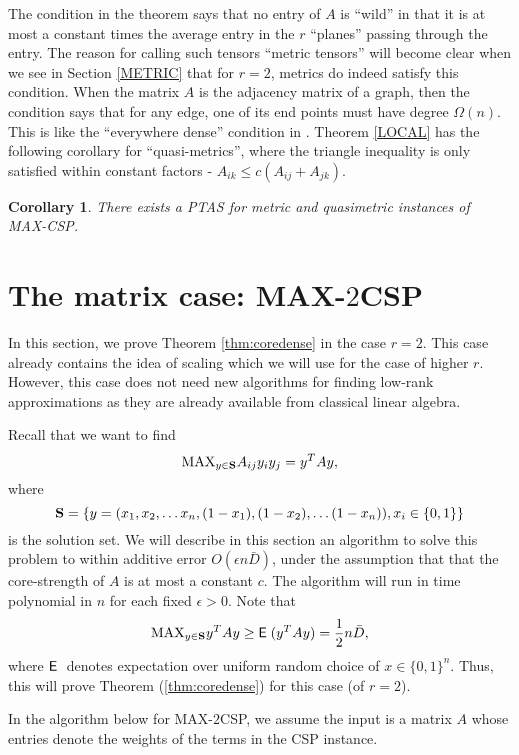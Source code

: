 \documentclass{book}
\newtheorem{corollary}[theorem]{Corollary}
\numberwithin{exercise}{chapter}
\begin{document}
The condition in the theorem
says that no entry of $A$ is ``wild'' in that it is
at most a constant times the average entry in the
$r$ ``planes'' passing through the entry. The reason for
calling such tensors ``metric tensors'' will become clear
when we see in Section \ref{METRIC}
that for $r=2$, metrics do indeed satisfy this condition.
When the matrix $A$ is the adjacency matrix of a graph, then
the condition says that for any edge, one of its end points
must have degree $\Omega (n)$. This is like the ``everywhere
dense'' condition in \cite{AKK95}.
Theorem \ref{LOCAL} has the following corollary for
``quasi-metrics'', where the
triangle inequality is only satisfied within constant factors -
$A_{ik}\leq c(A_{ij}+A_{jk})$.
\begin{corollary}\label{QM}
  There exists a PTAS for metric and quasimetric instances of MAX-CSP.
\end{corollary}




\section{The matrix case: MAX-$2$CSP}

In this section, we prove Theorem \ref{thm:coredense} in the case $r=2$.
This case already contains the idea of scaling which we will
use for the case of higher $r$. However, this
case does not need new algorithms for finding low-rank
approximations as they are already available from classical linear algebra.

Recall that we want to find
$$\hbox{MAX}_{y\in {\bf S}} A_{ij}y_iy_j = y^T Ay, $$
where
\[
{\bf S}=\{ y = (x_1,x_2,\ldots x_n,(1-x_1),(1-x_2),
\ldots (1-x_n)), x_i\in \{ 0,1\} \}
\]
is the solution set.
We will describe in this section an algorithm to solve this
problem to within additive error $O(\epsilon n\bar D)$,
under the assumption that that the
core-strength of $A$ is at most a constant $c$.
The algorithm will run in time polynomial in $n$
for each fixed $\epsilon >0$. Note that
\[
\hbox{MAX}_{y\in {\bf S}}y^TAy\geq \hbox{{\sf E}\;}(y^TAy) = {1\over 2}n\bar D,
\]
where
$\hbox{{\sf E}\;}$ denotes expectation over uniform random choice of $x\in \{ 0,1\}^n$.
Thus, this will prove Theorem (\ref{thm:coredense}) for this case (of $r=2$).

In the algorithm below for MAX-$2$CSP, we assume the input is a matrix $A$ whose entries denote the weights of the terms in the CSP instance.
\end{document}
